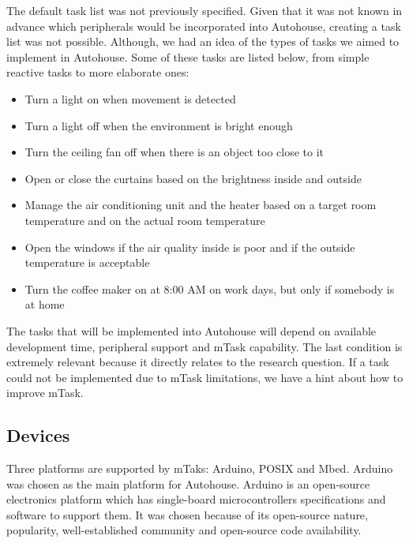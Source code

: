 The default task list was not previously specified. Given that it was not known in advance which peripherals would be incorporated into Autohouse, creating a task list was not possible. Although, we had an idea of the types of tasks we aimed to implement in Autohouse. Some of these tasks are listed below, from simple reactive tasks to more elaborate ones:

\begin{itemize}
    \item Turn a light on when movement is detected
    \item Turn a light off when the environment is bright enough
    \item Turn the ceiling fan off when there is an object too close to it
    \item Open or close the curtains based on the brightness inside and outside
    \item Manage the air conditioning unit and the heater based on a target room temperature and on the actual room temperature
    \item Open the windows if the air quality inside is poor and if the outside temperature is acceptable
    \item Turn the coffee maker on at 8:00 AM on work days, but only if somebody is at home
\end{itemize}

The tasks that will be implemented into Autohouse will depend on available development time, peripheral support and mTask capability. The last condition is extremely relevant because it directly relates to the research question. If a task could not be implemented due to mTask limitations, we have a hint about how to improve mTask.

\subsection{Devices}\label{sec:autohouse_devices}

Three platforms are supported by mTaks: Arduino, POSIX and Mbed. Arduino~\cite{arduino} was chosen as the main platform for Autohouse. Arduino is an open-source electronics platform which has single-board microcontrollers specifications and software to support them. It was chosen because of its open-source nature, popularity, well-established community and open-source code availability.

